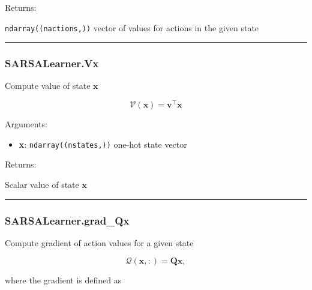 Returns:

\texttt{ndarray((nactions,))} vector of values for actions in the given
state

\begin{center}\rule{0.5\linewidth}{\linethickness}\end{center}

\subsubsection{SARSALearner.Vx}\label{sarsalearner.vx}

\begin{Shaded}
\begin{Highlighting}[]
\end{Highlighting}
\end{Shaded}

Compute value of state \(\mathbf x\)

\[
\mathcal V(\mathbf x) = \mathbf v^\top \mathbf x
\]

Arguments:

\begin{itemize}
\tightlist
\item
  \textbf{x}: \texttt{ndarray((nstates,))} one-hot state vector
\end{itemize}

Returns:

Scalar value of state \(\mathbf x\)

\begin{center}\rule{0.5\linewidth}{\linethickness}\end{center}

\subsubsection{SARSALearner.grad\_Qx}\label{sarsalearner.grad_qx}

\begin{Shaded}
\begin{Highlighting}[]
\end{Highlighting}
\end{Shaded}

Compute gradient of action values for a given state

\[
\mathcal Q(\mathbf x, :) = \mathbf Q \mathbf x,
\]

where the gradient is defined as

